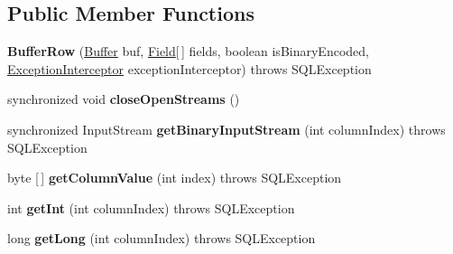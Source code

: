 \subsection*{Public Member Functions}
\begin{DoxyCompactItemize}
\item 
\mbox{\label{classcom_1_1mysql_1_1jdbc_1_1_buffer_row_a06cd63c4f7082a4d07d915ef3d1f3be4}} 
{\bfseries Buffer\+Row} (\mbox{\hyperlink{classcom_1_1mysql_1_1jdbc_1_1_buffer}{Buffer}} buf, \mbox{\hyperlink{classcom_1_1mysql_1_1jdbc_1_1_field}{Field}}\mbox{[}$\,$\mbox{]} fields, boolean is\+Binary\+Encoded, \mbox{\hyperlink{interfacecom_1_1mysql_1_1jdbc_1_1_exception_interceptor}{Exception\+Interceptor}} exception\+Interceptor)  throws S\+Q\+L\+Exception 
\item 
\mbox{\label{classcom_1_1mysql_1_1jdbc_1_1_buffer_row_af8dd4b86f6fdb083d437cedb0a98bc4f}} 
synchronized void {\bfseries close\+Open\+Streams} ()
\item 
\mbox{\label{classcom_1_1mysql_1_1jdbc_1_1_buffer_row_aa2e61cedf8ba72ca850b6761dfad96cd}} 
synchronized Input\+Stream {\bfseries get\+Binary\+Input\+Stream} (int column\+Index)  throws S\+Q\+L\+Exception 
\item 
\mbox{\label{classcom_1_1mysql_1_1jdbc_1_1_buffer_row_a53c9aedd636520eb969cef23f8b235b0}} 
byte \mbox{[}$\,$\mbox{]} {\bfseries get\+Column\+Value} (int index)  throws S\+Q\+L\+Exception 
\item 
\mbox{\label{classcom_1_1mysql_1_1jdbc_1_1_buffer_row_aea05396adfbb0e15800b5bd7d77bb426}} 
int {\bfseries get\+Int} (int column\+Index)  throws S\+Q\+L\+Exception 
\item 
\mbox{\label{classcom_1_1mysql_1_1jdbc_1_1_buffer_row_a7d4c72a0b8158e687f9f2a8ee634d6ed}} 
long {\bfseries get\+Long} (int column\+Index)  throws S\+Q\+L\+Exception 
\item 
\mbox{\label{classcom_1_1mysql_1_1jdbc_1_1_buffer_row_a0fd55a0504f2584239fabacc19a3d8b0}} 

\end{DoxyCompactItemize}
